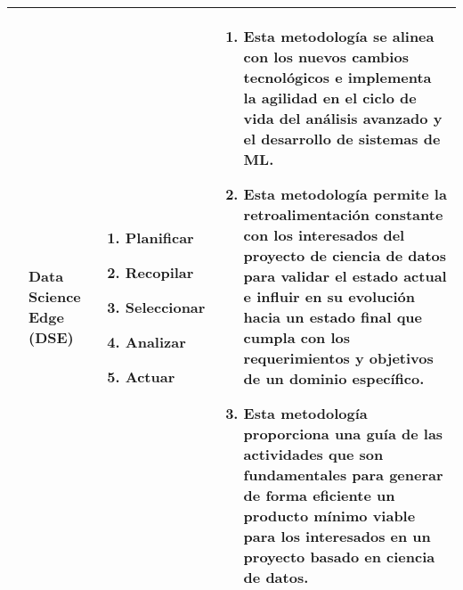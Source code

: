 \begin{table*}
\begin{threeparttable}
\begin{tabular}{ p{2cm} p{4cm} p{5cm} p{6cm}  }
			\citep{Grady2017}
			&Data Science Edge (DSE)
			&  \begin{enumerate}
				\item Planificar
				\item Recopilar
				\item Seleccionar
				\item Analizar
				\item Actuar
			\end{enumerate}
			& \begin{enumerate}
				\item Esta metodología se alinea con los nuevos cambios tecnológicos e implementa la agilidad en el ciclo de vida del análisis avanzado y el desarrollo de sistemas de ML.
				\item Esta metodología permite la retroalimentación constante con los interesados del proyecto de ciencia de datos para validar el estado actual e influir en su evolución hacia un estado final que cumpla con los requerimientos y objetivos de un dominio específico.
				\item Esta metodología proporciona una guía de las actividades que son fundamentales para generar de forma eficiente un producto mínimo viable para los interesados en un proyecto basado en ciencia de datos.
			\end{enumerate}
			\\ \hline
			

\end{tabular}
\end{threeparttable}
\end{table*}
